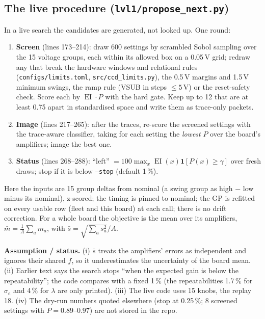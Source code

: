 \documentclass[10pt,a4paper]{article}
\newcommand{\code}[1]{\texttt{\small #1}}
\newcommand{\EI}{\operatorname{EI}}
\newcommand{\one}{\mathbf 1}
\newcommand{\caveat}[1]{\par\smallskip\noindent\colorbox{orange!10}{\parbox{\dimexpr\linewidth-2\fboxsep}{\small\textbf{Assumption / status.} #1}}\par\smallskip}
\begin{document}
\subsection{The live procedure (\code{lvl1/propose\_next.py})}
In a live search the candidates are generated, not looked up. One round:
\begin{enumerate}
\item \textbf{Screen} (lines 173--214): draw 600 settings by scrambled Sobol sampling \cite{sobol1967,owen1998} over the 15 voltage
  groups, each within its allowed box on a 0.05\,V grid; redraw any that break the hardware windows and relational rules
  (\code{configs/limits.toml}, \code{src/ccd\_limits.py}), the 0.5\,V margins and 1.5\,V minimum swings, the ramp rule
  (VSUB in steps $\le5$\,V) or the reset-safety check. Score each by $\EI\cdot P$ with the hard gate. Keep up to 12 that are
  at least 0.75 apart in standardised space and write them as trace-only packets.
\item \textbf{Image} (lines 217--265): after the traces, re-score the screened settings with the trace-aware classifier, taking
  for each setting the \emph{lowest} $P$ over the board's amplifiers; image the best one.
\item \textbf{Status} (lines 268--288): ``left'' $=100\max_x\EI(x)\one[P(x)\ge\gamma]$ over fresh draws; stop if it is below
  \code{--stop} (default 1\,\%).
\end{enumerate}
Here the inputs are 15 group deltas from nominal (a swing group as high $-$ low minus its nominal), z-scored; the timing is
pinned to nominal; the GP is refitted on every usable row (fleet and this board) at each call; there is no drift correction.
For a whole board the objective is the mean over its amplifiers, $\bar m=\frac1A\sum_am_a$, with
$\bar s=\sqrt{\sum_as_a^2}/A$.

\caveat{(i) $\bar s$ treats the amplifiers' errors as independent and ignores their shared $f$, so it underestimates the
uncertainty of the board mean. (ii) Earlier text says the search stops ``when the expected gain is below the repeatability'';
the code compares with a fixed 1\,\% (the repeatabilities 1.7\,\% for $\sigma_e$ and 4\,\% for $\lambda$ are only printed).
(iii) The live code uses 15 knobs, the replay 18. (iv) The dry-run numbers quoted elsewhere (stop at 0.25\,\%; 8 screened settings
with $P=0.89$--$0.97$) are not stored in the repo.}

\end{document}
